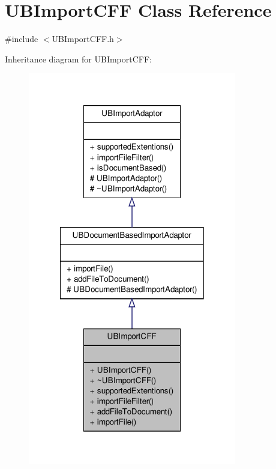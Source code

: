 \hypertarget{class_u_b_import_c_f_f}{\section{U\-B\-Import\-C\-F\-F Class Reference}
\label{db/d5b/class_u_b_import_c_f_f}
}


{\ttfamily \#include $<$U\-B\-Import\-C\-F\-F.\-h$>$}



Inheritance diagram for U\-B\-Import\-C\-F\-F\-:
\nopagebreak
\begin{figure}[H]
\begin{center}
\leavevmode
\includegraphics[width=258pt]{d5/d0d/class_u_b_import_c_f_f__inherit__graph}
\end{center}
\end{figure}


